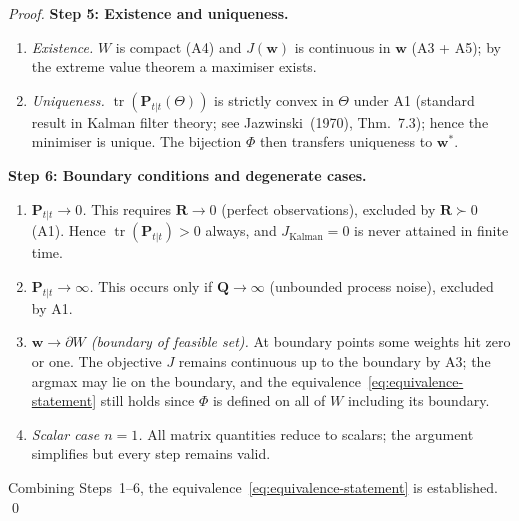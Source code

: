 \documentclass[12pt,openany]{book}
\numberwithin{equation}{chapter}
\theoremstyle{plain}
\theoremstyle{definition}
\theoremstyle{remark}
\DeclareMathOperator{\tr}{tr}
\def\mathcal#1{#1}%
\begin{document}
\begin{proof}
\medskip
\noindent\textbf{Step 5: Existence and uniqueness.}

\begin{enumerate}
  \item \emph{Existence.} $\mathcal{W}$ is compact (A4) and
        $J(\mathbf{w})$ is continuous in $\mathbf{w}$ (A3 + A5);
        by the extreme value theorem a maximiser exists.
  \item \emph{Uniqueness.} $\tr(\mathbf{P}_{t|t}(\Theta))$ is
        strictly convex in $\Theta$ under A1 (standard result in
        Kalman filter theory; see Jazwinski~(1970), Thm.~7.3);
        hence the minimiser is unique.  The bijection $\Phi$
        then transfers uniqueness to $\mathbf{w}^*$.
\end{enumerate}

\medskip
\noindent\textbf{Step 6: Boundary conditions and degenerate cases.}

\begin{enumerate}
  \item \emph{$\mathbf{P}_{t|t}\to 0$.}
        This requires $\mathbf{R}\to 0$ (perfect observations),
        excluded by $\mathbf{R}\succ 0$ (A1).  Hence
        $\tr(\mathbf{P}_{t|t})>0$ always, and
        $J_{\mathrm{Kalman}}=0$ is never attained in finite time.

  \item \emph{$\mathbf{P}_{t|t}\to\infty$.}
        This occurs only if $\mathbf{Q}\to\infty$
        (unbounded process noise), excluded by A1.

  \item \emph{$\mathbf{w}\to\partial\mathcal{W}$
        (boundary of feasible set).}
        At boundary points some weights hit zero or one.
        The objective $J$ remains continuous up to the boundary
        by A3; the argmax may lie on the boundary, and the
        equivalence~\eqref{eq:equivalence-statement} still holds
        since $\Phi$ is defined on all of $\mathcal{W}$ including
        its boundary.

  \item \emph{Scalar case $n=1$.}
        All matrix quantities reduce to scalars;
        the argument simplifies but every step remains valid.
\end{enumerate}

Combining Steps~1--6, the equivalence~\eqref{eq:equivalence-statement}
is established.  \qed
\end{proof}

\end{document}
